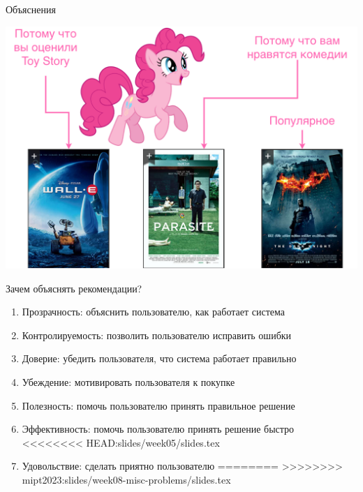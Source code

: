 \documentclass[11pt,aspectratio=169,handout]{beamer}
\begin{document}
\begin{frame}{Объяснения}

\begin{center}
\includegraphics[scale=0.22]{images/explainability-2.png}
\end{center}

\end{frame}

\begin{frame}{Зачем объяснять рекомендации?}

\begin{enumerate}[<+->]
\item Прозрачность: объяснить пользователю, как работает система
\item Контролируемость: позволить пользователю исправить ошибки
\item Доверие: убедить пользователя, что система работает правильно
\item Убеждение: мотивировать пользователя к покупке
\item Полезность: помочь пользователю принять правильное решение
\item Эффективность: помочь пользователю принять решение быстро
<<<<<<<< HEAD:slides/week05/slides.tex
\item Удовольствие: сделать приятно пользователю
========
>>>>>>>> mipt2023:slides/week08-misc-problems/slides.tex
\end{enumerate}

\end{frame}
\end{document}
